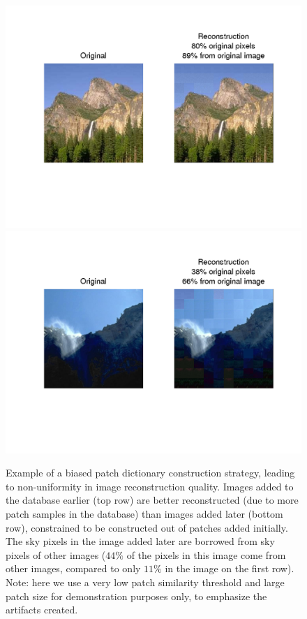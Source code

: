  \begin{figure}
\includegraphics[width=1\linewidth]{Figures/009.png}
\includegraphics[width=1\linewidth]{Figures/014.png}
\caption{Example of a biased patch dictionary construction strategy, leading to non-uniformity in image reconstruction quality. Images added to the database earlier (top row) are better reconstructed (due to more patch samples in the database) than images added later (bottom row), constrained to be constructed out of patches added initially. The sky pixels in the image added later are borrowed from sky pixels of other images ($44\%$ of the pixels in this image come from other images, compared to only $11\%$ in the image on the first row). Note: here we use a very low patch similarity threshold and large patch size for demonstration purposes only, to emphasize the artifacts created.}
\label{fig:sampStrategy}
\end{figure}


